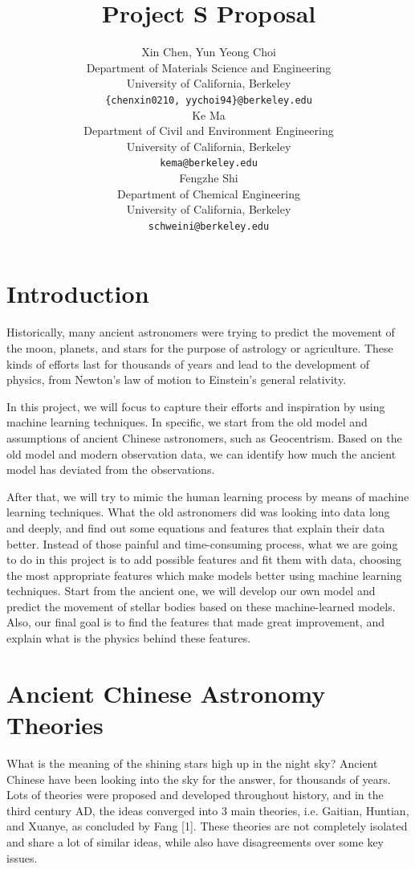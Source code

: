 \documentclass{article}
\title{Project S Proposal}
\author{%
  Xin Chen, Yun Yeong Choi  \\
  Department of Materials Science and Engineering\\
  University of California, Berkeley\\
  \texttt{\{chenxin0210, yychoi94\}@berkeley.edu} \\
   \And
   Ke Ma \\
   Department of Civil and Environment Engineering \\
   University of California, Berkeley \\
   \texttt{kema@berkeley.edu} \\
   \And
   Fengzhe Shi \\
   Department of Chemical Engineering \\
   University of California, Berkeley \\
   \texttt{schweini@berkeley.edu} \\
}
\begin{document}

\maketitle


\section{Introduction}

Historically, many ancient astronomers were trying to predict the movement of the moon, planets, and stars for the purpose of astrology or agriculture. These kinds of efforts last for thousands of years and lead to the development of physics, from Newton's law of motion to Einstein's general relativity. 

In this project, we will focus to capture their efforts and inspiration by using machine learning techniques. In specific, we start from the old model and assumptions of ancient Chinese astronomers, such as Geocentrism. Based on the old model and modern observation data, we can identify how much the ancient model has deviated from the observations.

After that, we will try to mimic the human learning process by means of machine learning techniques. What the old astronomers did was looking into data long and deeply, and find out some equations and features that explain their data better. Instead of those painful and time-consuming process, what we are going to do in this project is to add possible features and fit them with data, choosing the most appropriate features which make models better using machine learning techniques. Start from the ancient one, we will develop our own model and predict the movement of stellar bodies based on these machine-learned models. Also, our final goal is to find the features that made great improvement, and explain what is the physics behind these features.

\section{Ancient Chinese Astronomy Theories}
What is the meaning of the shining stars high up in the night sky? Ancient Chinese have been looking into the sky for the answer, for thousands of years. Lots of theories were proposed and developed throughout history, and in the third century AD, the ideas converged into 3 main theories, i.e. Gaitian, Huntian, and Xuanye, as concluded by Fang [1]. These theories are not completely isolated and share a lot of similar ideas, while also have disagreements over some key issues.
\end{document}
